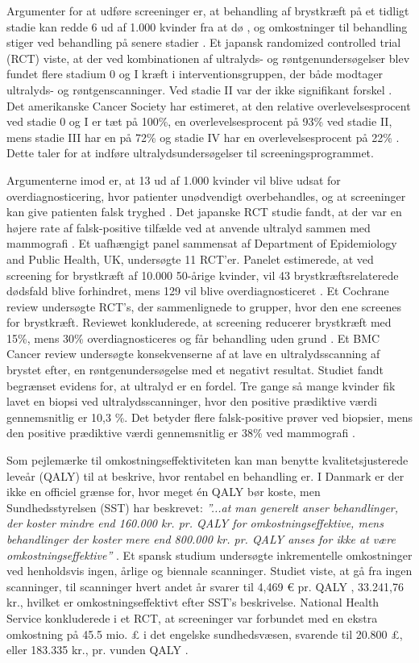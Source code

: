 Argumenter for at udføre screeninger er, at behandling af brystkræft på et tidligt stadie kan redde 6 ud af 1.000 kvinder fra at dø \cite{Argumenter}, og omkostninger til behandling stiger ved behandling på senere stadier \cite{StadieOmkostninger}. Et japansk randomized controlled trial (RCT) viste, at der ved kombinationen af ultralyds- og røntgenundersøgelser blev fundet flere stadium 0 og I kræft i interventionsgruppen, der både modtager ultralyds- og røntgenscanninger. Ved stadie II  var der ikke signifikant forskel \cite{Japan}. Det amerikanske Cancer Society har estimeret, at den relative overlevelsesprocent ved stadie 0 og I er tæt på 100\%, en overlevelsesprocent på 93\% ved stadie II, mens stadie III har en på 72\% og stadie IV har en overlevelsesprocent på 22\% \cite{CancerSociety}. Dette taler for at indføre ultralydsundersøgelser til screeningsprogrammet. 

Argumenterne imod er, at 13 ud af 1.000 kvinder vil blive udsat for overdiagnosticering, hvor patienter unødvendigt overbehandles, og at screeninger kan give patienten falsk tryghed \cite{Argumenter}. Det japanske RCT studie fandt, at der var en højere rate af falsk-positive tilfælde ved at anvende ultralyd sammen med mammografi \cite{Japan}. Et uafhængigt panel sammensat af Department of Epidemiology and Public Health, UK, undersøgte 11 RCT'er. Panelet estimerede, at ved screening for brystkræft af 10.000 50-årige kvinder, vil 43 brystkræftsrelaterede dødsfald blive forhindret, mens 129 vil blive overdiagnosticeret \cite{Panel}. Et Cochrane review undersøgte RCT's, der sammenlignede to grupper, hvor den ene screenes for brystkræft. Reviewet konkluderede, at screening reducerer brystkræft med 15\%, mens 30\% overdiagnosticeres og får behandling uden grund \cite{Gotzche}. Et BMC Cancer review undersøgte konsekvenserne af at lave en ultralydsscanning af brystet efter, en røntgenundersøgelse med et negativt resultat. Studiet fandt begrænset evidens for, at ultralyd er en fordel. Tre gange så mange kvinder fik lavet en biopsi ved ultralydsscanninger, hvor den positive prædiktive værdi gennemsnitlig er 10,3 \%. Det betyder flere falsk-positive prøver ved biopsier, mens den positive prædiktive værdi gennemsnitlig er 38\% ved mammografi \cite{DenseBreast}. 

Som pejlemærke til omkostningseffektiviteten kan man benytte kvalitetsjusterede leveår (QALY) til at beskrive, hvor rentabel en behandling er. I Danmark er der ikke en officiel grænse for, hvor meget én QALY bør koste, men Sundhedsstyrelsen (SST) har beskrevet: \textit{”...at man generelt anser behandlinger, der koster mindre end 160.000 kr. pr. QALY for omkostningseffektive, mens behandlinger der koster mere end 800.000 kr. pr. QALY anses for ikke at være omkostningseffektive”} \cite{QALY}. 
Et spansk studium undersøgte inkrementelle omkostninger ved henholdsvis ingen, årlige og biennale scanninger. Studiet viste, at gå fra ingen scanninger, til scanninger hvert andet år svarer til 4,469 € pr. QALY \cite{SpanskStudie}, 33.241,76 kr., hvilket er omkostningseffektivt efter SST's beskrivelse. National Health Service konkluderede i et RCT, at screeninger var forbundet med en ekstra omkostning på 45.5 mio. £ i det engelske sundhedsvæsen, svarende til 20.800 £, eller 183.335 kr., pr. vunden QALY \cite{NHS}.


